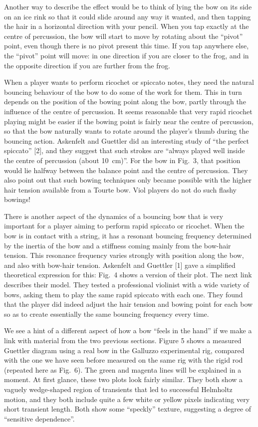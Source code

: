   Another way to describe the effect would be to think of lying the bow on its 
  side on an ice rink so that it could slide around any way it wanted, and then 
  tapping the hair in a horizontal direction with your pencil. When you tap 
  exactly at the centre of percussion, the bow will start to move by rotating 
  about the “pivot” point, even though there is no pivot present this time. If 
  you tap anywhere else, the “pivot” point will move: in one direction if you 
  are closer to the frog, and in the opposite direction if you are further from 
  the frog. 

  When a player wants to perform ricochet or spiccato notes, they need the 
  natural bouncing behaviour of the bow to do some of the work for them. This 
  in turn depends on the position of the bowing point along the bow, partly 
  through the influence of the centre of percussion. It seems reasonable that 
  very rapid ricochet playing might be easier if the bowing point is fairly 
  near the centre of percussion, so that the bow naturally wants to rotate 
  around the player’s thumb during the bouncing action. Askenfelt and Guettler 
  did an interesting study of “the perfect spiccato” [2], and they suggest that 
  such strokes are ``always played well inside the centre of percussion (about 
  10~cm)''. For the bow in Fig.\ 3, that position would lie halfway between the 
  balance point and the centre of percussion. They also point out that such 
  bowing techniques only became possible with the higher hair tension available 
  from a Tourte bow. Viol players do not do such flashy bowings! 

  There is another aspect of the dynamics of a bouncing bow that is very 
  important for a player aiming to perform rapid spiccato or ricochet. When the 
  bow is in contact with a string, it has a resonant bouncing frequency 
  determined by the inertia of the bow and a stiffness coming mainly from the 
  bow-hair tension. This resonance frequency varies strongly with position 
  along the bow, and also with bow-hair tension. Askenfelt and Guettler [1] 
  gave a simplified theoretical expression for this: Fig.\ 4 shows a version of 
  their plot. The next link describes their model. They tested a professional 
  violinist with a wide variety of bows, asking them to play the same rapid 
  spiccato with each one. They found that the player did indeed adjust the hair 
  tension and bowing point for each bow so as to create essentially the same 
  bouncing frequency every time. 

  We see a hint of a different aspect of how a bow “feels in the hand” if we 
  make a link with material from the two previous sections. Figure 5 shows a 
  measured Guettler diagram using a real bow in the Galluzzo experimental rig, 
  compared with the one we have seen before measured on the same rig with the 
  rigid rod (repeated here as Fig.\ 6). The green and magenta lines will be 
  explained in a moment. At first glance, these two plots look fairly similar. 
  They both show a vaguely wedge-shaped region of transients that led to 
  successful Helmholtz motion, and they both include quite a few white or 
  yellow pixels indicating very short transient length. Both show some 
  “speckly” texture, suggesting a degree of “sensitive dependence”. 

